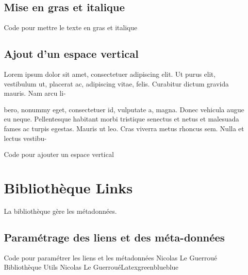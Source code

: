 {\section{Mise en gras et italique}

\sn

\begin{Latex}{Code pour mettre le texte en gras et italique}
\end{Latex}


\section{Ajout d'un espace vertical}

Lorem ipsum dolor sit amet, consectetuer adipiscing elit. Ut purus elit, vestibulum
ut, placerat ac, adipiscing vitae, felis. Curabitur dictum gravida mauris. Nam arcu li- \sn

bero, nonummy eget, consectetuer id, vulputate a, magna. Donec vehicula augue eu
neque. Pellentesque habitant morbi tristique senectus et netus et malesuada fames ac
turpis egestas. Mauris ut leo. Cras viverra metus rhoncus sem. Nulla et lectus vestibu-

\begin{Latex}{Code pour ajouter un espace vertical}
\sn
\end{Latex}

\chapter{Bibliothèque Links}

La bibliothèque  gère les métadonnées.

\section{Paramétrage des liens et des méta-données}

\begin{Latex}{Code pour paramétrer les liens et les métadonnées}
 {Nicolas Le Guerroué} {Bibliothèque Utils} {Nicolas Le Guerroué}{Latex}{green}{blue}{blue}
    

\end{Latex}}
